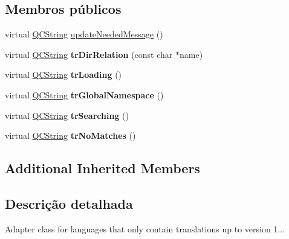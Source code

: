 \subsection*{Membros públicos}
\begin{DoxyCompactItemize}
\item 
virtual \hyperlink{class_q_c_string}{Q\-C\-String} \hyperlink{class_translator_adapter__1__6__0_aa2c053398a494e36caf5152d9a4fc6cf}{update\-Needed\-Message} ()
\item 
\hypertarget{class_translator_adapter__1__6__0_a38a56cc8bcc5323be9d1f09b0daa5933}{virtual \hyperlink{class_q_c_string}{Q\-C\-String} {\bfseries tr\-Dir\-Relation} (const char $\ast$name)}\label{class_translator_adapter__1__6__0_a38a56cc8bcc5323be9d1f09b0daa5933}

\item 
\hypertarget{class_translator_adapter__1__6__0_aca8cf7409bceb9f8e6af47f637da5457}{virtual \hyperlink{class_q_c_string}{Q\-C\-String} {\bfseries tr\-Loading} ()}\label{class_translator_adapter__1__6__0_aca8cf7409bceb9f8e6af47f637da5457}

\item 
\hypertarget{class_translator_adapter__1__6__0_aa9fd39641e570165be20c71c67481fee}{virtual \hyperlink{class_q_c_string}{Q\-C\-String} {\bfseries tr\-Global\-Namespace} ()}\label{class_translator_adapter__1__6__0_aa9fd39641e570165be20c71c67481fee}

\item 
\hypertarget{class_translator_adapter__1__6__0_aea79f5912e787bbb2c441223ccd382c6}{virtual \hyperlink{class_q_c_string}{Q\-C\-String} {\bfseries tr\-Searching} ()}\label{class_translator_adapter__1__6__0_aea79f5912e787bbb2c441223ccd382c6}

\item 
\hypertarget{class_translator_adapter__1__6__0_a240e49b617153456e0f29bef561cc10f}{virtual \hyperlink{class_q_c_string}{Q\-C\-String} {\bfseries tr\-No\-Matches} ()}\label{class_translator_adapter__1__6__0_a240e49b617153456e0f29bef561cc10f}

\end{DoxyCompactItemize}
\subsection*{Additional Inherited Members}


\subsection{Descrição detalhada}
Adapter class for languages that only contain translations up to version 1... 

